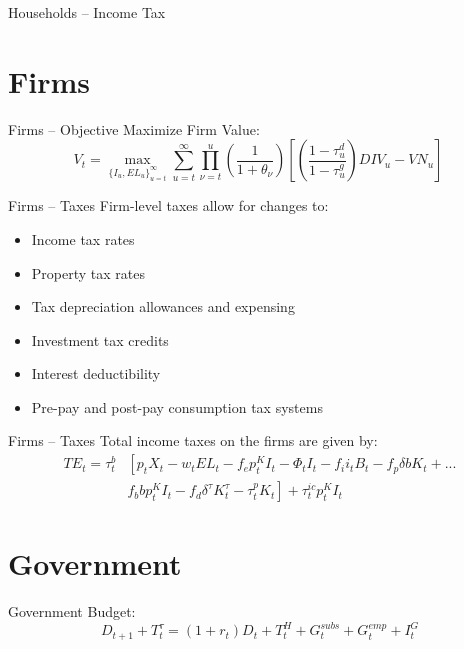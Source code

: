 \documentclass{beamer}
\begin{document}
\begin{frame}{Households -- Income Tax}
  \end{frame}

\section{Firms}
  \begin{frame}{Firms -- Objective}
  Maximize Firm Value: \\
  \begin{equation}
         V_{t}= \max_{\{I_{u},EL_{u}\}^{\infty}_{u=t}}  \sum_{u=t}^{\infty} \prod_{\nu=t}^{u}\left(\frac{1}{1+\theta_{\nu}}\right)\left[ \left(\frac{1-\tau^{d}_{u}}{1-\tau^{g}_{u}}\right)DIV_{u}-VN_{u}\right]\
  \end{equation}
  \end{frame}

    \begin{frame}{Firms -- Taxes}
    Firm-level taxes allow for changes to:
\begin{itemize}
\item Income tax rates
\item Property tax rates
\item Tax depreciation allowances and expensing
\item Investment tax credits
\item Interest deductibility
\item Pre-pay and post-pay consumption tax systems
\end{itemize}
 \end{frame}
  
    \begin{frame}{Firms -- Taxes}
    Total income taxes on the firms are given by:
  \begin{equation}
\label{eqn:corp_tax}
\begin{split}
TE_{t}=  \tau^{b}_{t} & \left[  p_{t}X_{t}-w_{t}EL_{t}-f_{e}p^{K}_{t}I_{t}-\Phi_{t}I_{t}-f_{i}i_{t}B_{t}-f_{p}\delta b K_{t}+... \right. \\
 &  \left.  f_{b}bp^{K}_{t}I_{t}-f_{d}\delta^{\tau}K^{\tau}_{t}-\tau^{p}_{t}K_{t}\right] +\tau^{ic}_{t}p^{K}_{t}I_{t}
\end{split}
\end{equation}
 \end{frame}


\section{Government}
  \begin{frame}{Government Budget:}
  \begin{equation}
 \label{eqn:gbc}
      D_{t+1} + T^{\tau}_{t} = (1+r_{t})D_{t} + T^{H}_{t} + G^{subs}_{t} + G^{emp}_{t} + I^{G}_{t}
      \end{equation}
  \end{frame}
\end{document}
